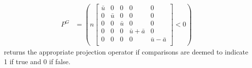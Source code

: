 \documentclass[letterpaper,11pt,nointlimits,reqno,draft]{amsbook}
\begin{document}
\begin{align}
\label{eq:PGmedida}
  P^G
  &=
  \left(
  n
  \left[\begin{array}{ccccc}
    \bar{u} & 0       & 0       & 0                 & 0                 \\
    0       & \bar{u} & 0       & 0                 & 0                 \\
    0       & 0       & \bar{u} & 0                 & 0                 \\
    0       & 0       & 0       & \bar{u} + \bar{a} & 0                 \\
    0       & 0       & 0       & 0                 & \bar{u} - \bar{a} \\
  \end{array}\right]
  <
  0
  \right)
\end{align}
returns the appropriate projection operator if comparisons are deemed to
indicate 1 if true and 0 if false.
\end{document}
